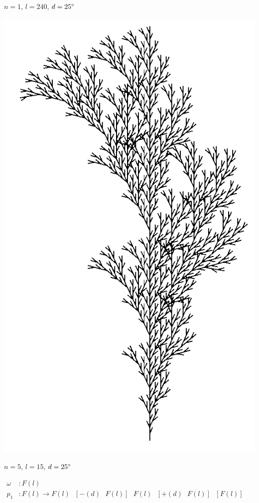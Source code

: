 \begin{center}
\begin{minipage}[c]{0.45\textwidth}
		$n=1$, $l=240$, $d=25\degree$
	\end{minipage}
	\begin{minipage}[c]{0.45\textwidth}
		\centering
		\includegraphics[height=.75\textheight]{images/CH2_Branching2_N5L15D25.png}
		
		$n=5$, $l=15$, $d=25\degree$
	\end{minipage}
	\vspace{0.075\textheight}
	
	$\begin{array}{ll}
	\omega & : F(l) \\
	p_1 & : F(l) \rightarrow F(l)\text{ }[-(d)\text{ }F(l)]\text{ }F(l)\text{ }[+(d)\text{ }F(l)]\text{ }[F(l)]
	\end{array}$
\end{center}




